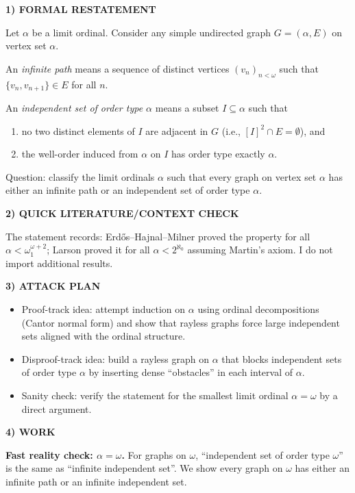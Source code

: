 \noindent\textbf{1) FORMAL RESTATEMENT}\par
Let $\alpha$ be a limit ordinal. Consider any simple undirected graph $G=(\alpha,E)$ on vertex set $\alpha$.

An \emph{infinite path} means a sequence of distinct vertices $(v_n)_{n<\omega}$ such that $\{v_n,v_{n+1}\}\in E$ for all $n$.

An \emph{independent set of order type $\alpha$} means a subset $I\subseteq\alpha$ such that
\begin{enumerate}
\item no two distinct elements of $I$ are adjacent in $G$ (i.e., $[I]^2\cap E=\emptyset$), and
\item the well-order induced from $\alpha$ on $I$ has order type exactly $\alpha$.
\end{enumerate}

Question: classify the limit ordinals $\alpha$ such that every graph on vertex set $\alpha$ has either an infinite path or an independent set of order type $\alpha$.

\noindent\textbf{2) QUICK LITERATURE/CONTEXT CHECK}\par
The statement records: Erd\H{o}s--Hajnal--Milner proved the property for all $\alpha<\omega_1^{\omega+2}$; Larson proved it for all $\alpha<2^{\aleph_0}$ assuming Martin's axiom. I do not import additional results.

\noindent\textbf{3) ATTACK PLAN}\par
\begin{itemize}
\item Proof-track idea: attempt induction on $\alpha$ using ordinal decompositions (Cantor normal form) and show that rayless graphs force large independent sets aligned with the ordinal structure.
\item Disproof-track idea: build a rayless graph on $\alpha$ that blocks independent sets of order type $\alpha$ by inserting dense ``obstacles'' in each interval of $\alpha$.
\item Sanity check: verify the statement for the smallest limit ordinal $\alpha=\omega$ by a direct argument.
\end{itemize}

\noindent\textbf{4) WORK}\par
\textbf{Fast reality check: $\alpha=\omega$.} For graphs on $\omega$, ``independent set of order type $\omega$'' is the same as ``infinite independent set''. We show every graph on $\omega$ has either an infinite path or an infinite independent set.

